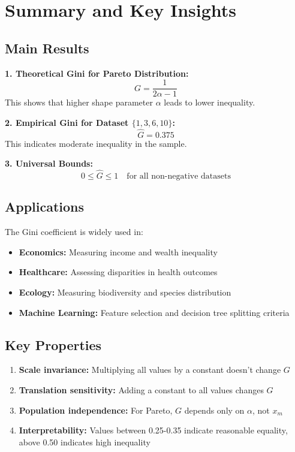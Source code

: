 \documentclass[12pt,a4paper]{article}
\theoremstyle{definition}
\begin{document}
\section{Summary and Key Insights}

\begin{tcolorbox}[colback=yellow!10!white,colframe=orange,title=Final Summary]
\subsection*{Main Results}

\textbf{1. Theoretical Gini for Pareto Distribution:}
\[
G = \frac{1}{2\alpha - 1}
\]
This shows that higher shape parameter $\alpha$ leads to lower inequality.

\textbf{2. Empirical Gini for Dataset $\{1, 3, 6, 10\}$:}
\[
\hat{G} = 0.375
\]
This indicates moderate inequality in the sample.

\textbf{3. Universal Bounds:}
\[
0 \leq \hat{G} \leq 1 \quad \text{for all non-negative datasets}
\]

\subsection*{Applications}

The Gini coefficient is widely used in:
\begin{itemize}
    \item \textbf{Economics:} Measuring income and wealth inequality
    \item \textbf{Healthcare:} Assessing disparities in health outcomes
    \item \textbf{Ecology:} Measuring biodiversity and species distribution
    \item \textbf{Machine Learning:} Feature selection and decision tree splitting criteria
\end{itemize}

\subsection*{Key Properties}

\begin{enumerate}
    \item \textbf{Scale invariance:} Multiplying all values by a constant doesn't change $G$
    \item \textbf{Translation sensitivity:} Adding a constant to all values changes $G$
    \item \textbf{Population independence:} For Pareto, $G$ depends only on $\alpha$, not $x_m$
    \item \textbf{Interpretability:} Values between 0.25-0.35 indicate reasonable equality, above 0.50 indicates high inequality
\end{enumerate}
\end{tcolorbox}
\end{document}
